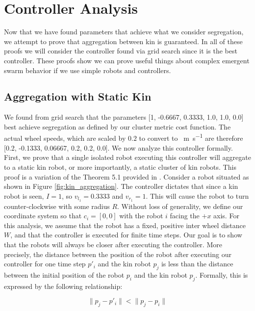 \documentclass[conference]{IEEEtran}
\begin{document}
\section{Controller Analysis}

  Now that we have found parameters that achieve what we consider segregation, we attempt to prove that aggregation between kin is guaranteed. In all of these proofs we will consider the controller found via grid search since it is the best controller. These proofs show we can prove useful things about complex emergent swarm behavior if we use simple robots and controllers.

  \subsection{Aggregation with Static Kin}

    We found from grid search that the parameters [1, -0.6667, 0.3333, 1.0, 1.0, 0.0] best achieve segregation as defined by our cluster metric cost function. The actual wheel speeds, which are scaled by $0.2$ to convert to \SI{}{\meter\per\second} are therefore [0.2, -0.1333, 0.06667, 0.2, 0.2, 0.0]. We now analyze this controller formally. First, we prove that a single isolated robot executing this controller will aggregate to a static kin robot, or more importantly, a static cluster of kin robots. This proof is a variation of the Theorem 5.1 provided in \cite{gauci_self-organized_2014}. Consider a robot situated as shown in Figure \ref{fig:kin_aggregation}. The controller dictates that since a kin robot is seen, $I=1$, so $v_{l_1} = 0.3333$ and $v_{r_1} = 1$. This will cause the robot to turn counter-clockwise with some radius $R$. Without loss of generality, we define our coordinate system so that $c_i=[0,0]$ with the robot $i$ facing the $+x$ axis. For this analysis, we assume that the robot has a fixed, positive inter wheel distance $W$, and that the controller is executed for finite time steps. Our goal is to show that the robots will always be closer after executing the controller. More precisely, the distance between the position of the robot after executing our controller for one time step $p'_i$ and the kin robot $p_j$ is less than the distance between the initial position of the robot $p_i$ and the kin robot $p_j$. Formally, this is expressed by the following relationship:

    \begin{equation} \label{eq:agg}
      \lVert p_j - p'_i \rVert < \lVert p_j - p_i \rVert
    \end{equation}
\end{document}
